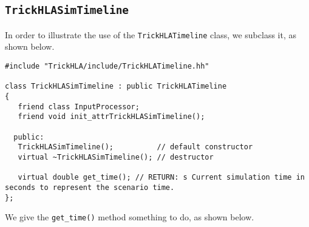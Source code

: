 \subsection{{\tt TrickHLASimTimeline}}

In order to illustrate the use of the {\tt TrickHLATimeline} class, we  subclass
it, as shown below.

\begin{lstlisting}[caption={{\tt TrickHLASimTimeline} class header}]
#include "TrickHLA/include/TrickHLATimeline.hh"

class TrickHLASimTimeline : public TrickHLATimeline
{
   friend class InputProcessor;
   friend void init_attrTrickHLASimTimeline();

  public:
   TrickHLASimTimeline();          // default constructor
   virtual ~TrickHLASimTimeline(); // destructor

   virtual double get_time(); // RETURN: s Current simulation time in seconds to represent the scenario time.
};
\end{lstlisting}

We give the {\tt get\_time()} method something to do, as shown below.

